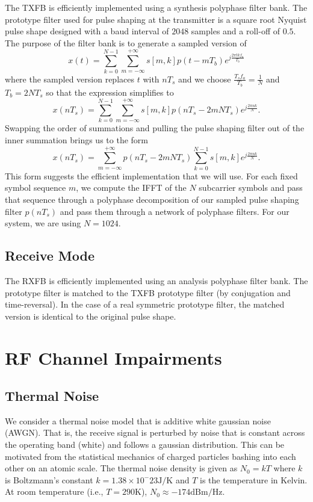 \documentclass[conference]{IEEEtran}
\begin{document}
The TXFB is efficiently implemented using a synthesis polyphase filter bank.
The prototype filter used for pulse shaping at the transmitter is a square root
Nyquist pulse shape designed with a baud interval of $2048$ samples and a
roll-off of $0.5$. The purpose of the filter bank is to generate a sampled version of
\begin{equation}
x(t) = \sum_{k=0}^{N-1} \sum_{m=-\infty}^{+\infty} s[m, k] p(t - m T_b) e^{j \frac{2 \pi t k f_a}{T_b}}
\end{equation}
where the sampled version replaces $t$ with $n T_s$ and we choose $\frac{T_s f_a}{T_b} = \frac{1}{N}$
and $T_b = 2 N T_s$ so that the expression simplifies to
\begin{equation}
x(n T_s) = \sum_{k=0}^{N-1} \sum_{m=-\infty}^{+\infty} s[m, k] p(n T_s - 2 m N T_s) e^{j \frac{2 \pi n k}{N}}.
\end{equation}
Swapping the order of summations and pulling the pulse shaping filter out of the inner summation
brings us to the form
\begin{equation}
x(n T_s) = \sum_{m=-\infty}^{+\infty} p(n T_s - 2 m N T_s) \sum_{k=0}^{N-1} s[m, k] e^{j \frac{2 \pi n k}{N}}.
\end{equation}
This form suggests the efficient implementation that we will use. For each fixed symbol sequence $m$,
we compute the IFFT of the $N$ subcarrier symbols and pass that sequence through a polyphase decomposition
of our sampled pulse shaping filter $p(n T_s)$ and pass them through a network of polyphase filters. For
our system, we are using $N=1024$.

\subsection*{Receive Mode}

The RXFB is efficiently implemented using an analysis polyphase filter bank.
The prototype filter is matched to the TXFB prototype filter (by conjugation and
time-reversal). In the case of a real symmetric prototype filter, the matched
version is identical to the original pulse shape.

\section{RF Channel Impairments}
\label{sec:chan}

\subsection*{Thermal Noise}
We consider a thermal noise model that is additive white gaussian noise (AWGN).
That is, the receive signal is perturbed by noise that is constant across the
operating band (white) and follows a gaussian distribution. This can be motivated
from the statistical mechanics of charged particles bashing into each other on an
atomic scale. The thermal noise density is given as $N_0 = k T$ where $k$ is
Boltzmann's constant $k = 1.38 \times 10^-23 \mbox{J/K}$ and $T$ is the
temperature in Kelvin. At room temperature (i.e., $T = 290 \mbox{K}$),
$N_0 \approx -174 \mbox{dBm/Hz}$.
\end{document}
